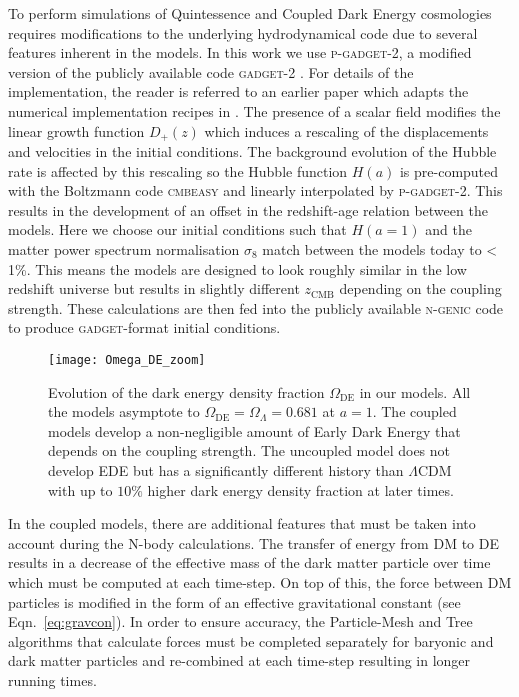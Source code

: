 \documentclass[a4paper,fleqn,usenatbib]{mnras}
\begin{document}
To perform simulations of Quintessence and Coupled Dark Energy cosmologies requires modifications to the underlying hydrodynamical code due to several features inherent in the models. In this work we use \textsc{p-gadget}-2, a modified version of the publicly available code \textsc{gadget}-2 \citep{2005MNRAS.364.1105S}. For details of the implementation, the reader is referred to an earlier paper \citep{2014MNRAS.439.2943C} which adapts the numerical implementation recipes in \citet{2010MNRAS.403.1684B}. The presence of a scalar field modifies the linear growth function $D_{+}(z)$ which induces a rescaling of the displacements and velocities in the initial conditions. The background evolution of the Hubble rate is affected by this rescaling so the Hubble function $H(a)$ is pre-computed with the Boltzmann code \textsc{cmbeasy} and linearly interpolated by \textsc{p-gadget}-2. This results in the development of an offset in the redshift-age relation between the models. Here we choose our initial conditions such that $H(a=1)$ and the matter power spectrum normalisation $\sigma_8$ match between the models today to < 1\%. This means the models are designed to look roughly similar in the low redshift universe but results in slightly different $z_{\mathrm{CMB}}$ depending on the coupling strength. These calculations are then fed into the publicly available \textsc{n-genic} code to produce \textsc{gadget}-format initial conditions.

\begin{figure}
	\texttt{[image: Omega\_DE\_zoom]}
    \caption{Evolution of the dark energy density fraction $\Omega_{\mathrm{DE}}$ in our models. All the models asymptote to $\Omega_{\mathrm{DE}} = \Omega_{\Lambda} = 0.681$ at $a=1$. The coupled models develop a non-negligible amount of Early Dark Energy that depends on the coupling strength. The uncoupled model does not develop EDE but has a significantly different history than $\Lambda$CDM with up to $10\%$ higher dark energy density fraction at later times.}
    \label{fig:de_frac}
\end{figure}

In the coupled models, there are additional features that must be taken into account during the N-body calculations. The transfer of energy from DM to DE results in a decrease of the effective mass of the dark matter particle over time which must be computed at each time-step. On top of this, the  force between DM particles is modified in the form of an effective gravitational constant (see Eqn.~\ref{eq:gravcon}). In order to ensure accuracy, the Particle-Mesh and Tree algorithms that calculate forces must be completed separately for baryonic and dark matter particles and re-combined at each time-step resulting in longer running times.
\end{document}
